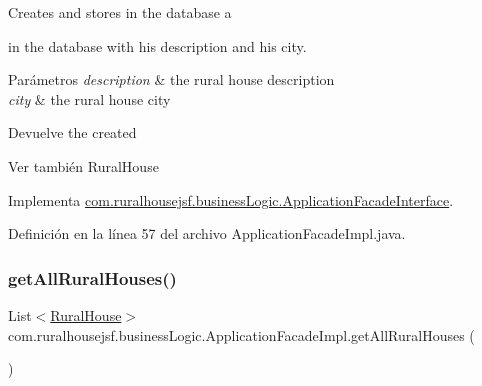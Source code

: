 Creates and stores in the database a
\begin{DoxyCode}{0}
\end{DoxyCode}
 in the database with his description and his city.


\begin{DoxyParams}{Parámetros}
{\em description} & the rural house description \\
\hline
{\em city} & the rural house city\\
\hline
\end{DoxyParams}
\begin{DoxyReturn}{Devuelve}
the created
\begin{DoxyCode}{0}
\end{DoxyCode}

\end{DoxyReturn}
\begin{DoxySeeAlso}{Ver también}
Rural\+House 
\end{DoxySeeAlso}


Implementa \mbox{\hyperlink{interfacecom_1_1ruralhousejsf_1_1business_logic_1_1_application_facade_interface_a7fc244cf74494e50a01148496d1b45ad}{com.\+ruralhousejsf.\+business\+Logic.\+Application\+Facade\+Interface}}.



Definición en la línea 57 del archivo Application\+Facade\+Impl.\+java.

\mbox{\label{classcom_1_1ruralhousejsf_1_1business_logic_1_1_application_facade_impl_a22bb7d4b98f51470315a81cd0d6f2290}} 
\subsubsection{\texorpdfstring{getAllRuralHouses()}{getAllRuralHouses()}}
{\footnotesize\ttfamily List$<$\mbox{\hyperlink{classcom_1_1ruralhousejsf_1_1domain_1_1_rural_house}{Rural\+House}}$>$ com.\+ruralhousejsf.\+business\+Logic.\+Application\+Facade\+Impl.\+get\+All\+Rural\+Houses (\begin{DoxyParamCaption}{ }\end{DoxyParamCaption})}

